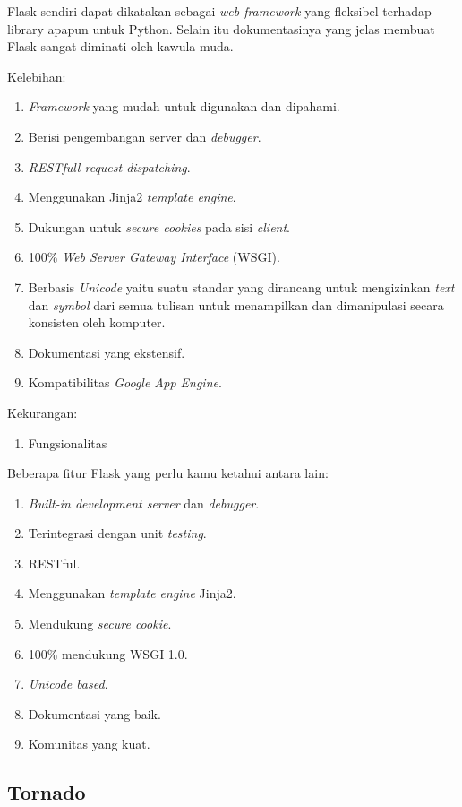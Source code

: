 Flask sendiri dapat dikatakan sebagai \textit{web framework} yang fleksibel terhadap library apapun untuk Python. Selain itu dokumentasinya yang jelas membuat Flask sangat diminati oleh kawula muda.

Kelebihan:
\begin{enumerate}
	\item \textit{Framework} yang mudah untuk digunakan dan dipahami.
	\item Berisi pengembangan server dan \textit{debugger}.
	\item \textit{RESTfull request dispatching}.
	\item Menggunakan Jinja2 \textit{template engine}.
	\item Dukungan untuk \textit{secure cookies} pada sisi \textit{client}.
	\item 100\% \textit{Web Server Gateway Interface} (WSGI).
	\item Berbasis \textit{Unicode} yaitu suatu standar yang dirancang untuk mengizinkan \textit{text} dan \textit{symbol} dari semua tulisan untuk menampilkan dan dimanipulasi secara konsisten oleh komputer.
	\item Dokumentasi yang ekstensif.
	\item Kompatibilitas \textit{Google App Engine}.
\end{enumerate}

Kekurangan:
\begin{enumerate}
\item Fungsionalitas
\end{enumerate}

Beberapa fitur Flask yang perlu kamu ketahui antara lain:
\begin{enumerate}
	\item \textit{Built-in development server} dan \textit{debugger}.
	\item Terintegrasi dengan unit \textit{testing}.
	\item RESTful.
	\item Menggunakan \textit{template engine} Jinja2.
	\item Mendukung \textit{secure cookie}.
	\item 100\% mendukung WSGI 1.0.
	\item \textit{Unicode based}.
	\item Dokumentasi yang baik.
	\item Komunitas yang kuat.
\end{enumerate}

\subsection{Tornado}

